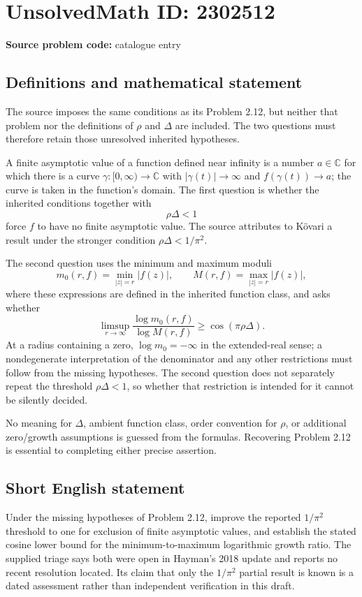 \documentclass[11pt]{article}
\newcommand{\C}{\mathbb{C}}
\begin{document}
\section*{UnsolvedMath ID: 2302512}
\textbf{Source problem code:} catalogue entry
\subsection{Definitions and mathematical statement}
The source imposes the same conditions as its Problem 2.12, but neither that problem nor the definitions of $\rho$ and $\Delta$ are included. The two questions must therefore retain those unresolved inherited hypotheses.

A finite asymptotic value of a function defined near infinity is a number $a\in\C$ for which there is a curve $\gamma:[0,\infty)\to\C$ with $|\gamma(t)|\to\infty$ and $f(\gamma(t))\to a$; the curve is taken in the function's domain. The first question is whether the inherited conditions together with
\[
 \rho\Delta<1
\]
force $f$ to have no finite asymptotic value. The source attributes to Kövari a result under the stronger condition $\rho\Delta<1/\pi^2$.

The second question uses the minimum and maximum moduli
\[
 m_0(r,f)=\min_{|z|=r}|f(z)|,\qquad
 M(r,f)=\max_{|z|=r}|f(z)|,
\]
where these expressions are defined in the inherited function class, and asks whether
\[
 \limsup_{r\to\infty}
 \frac{\log m_0(r,f)}{\log M(r,f)}
 \geq\cos(\pi\rho\Delta).
\]
At a radius containing a zero, $\log m_0=-\infty$ in the extended-real sense; a nondegenerate interpretation of the denominator and any other restrictions must follow from the missing hypotheses. The second question does not separately repeat the threshold $\rho\Delta<1$, so whether that restriction is intended for it cannot be silently decided.

No meaning for $\Delta$, ambient function class, order convention for $\rho$, or additional zero/growth assumptions is guessed from the formulas. Recovering Problem 2.12 is essential to completing either precise assertion.
\subsection{Short English statement}
Under the missing hypotheses of Problem 2.12, improve the reported $1/\pi^2$ threshold to one for exclusion of finite asymptotic values, and establish the stated cosine lower bound for the minimum-to-maximum logarithmic growth ratio. The supplied triage says both were open in Hayman's 2018 update and reports no recent resolution located. Its claim that only the $1/\pi^2$ partial result is known is a dated assessment rather than independent verification in this draft.
\end{document}
